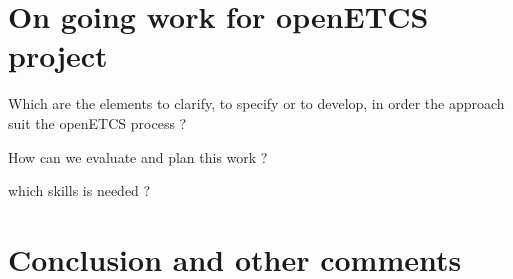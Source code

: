 \section{On going work for openETCS project}

\begin{todo_comment}
Which are the elements to clarify, to specify or to develop, in order the approach suit the openETCS process ?

How can we evaluate and plan this work ?

which skills is needed ?
\end{todo_comment}

\section{Conclusion and other comments}
